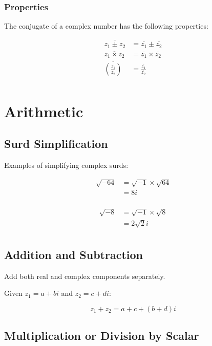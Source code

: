 \documentclass[a4paper,11pt]{article}
\begin{document}
\subsubsection{Properties}

The conjugate of a complex number has the following properties:

$$
\begin{aligned}
\overline{z_1 \pm z_2} & = \overline{z_1} \pm \overline{z_2} \\
\overline{z_1 \times z_2} & = \overline{z_1} \times \overline{z_2} \\
\overline{(\frac{z_1}{z_2})} & = \frac{\overline{z_1}}{\overline{z_2}} \\
\end{aligned}
$$




\section{Arithmetic}

\subsection{Surd Simplification}

Examples of simplifying complex surds:

$$
\begin{aligned}
\sqrt{-64} & = \sqrt{-1} \times \sqrt{64} \\
& = 8i \\
\end{aligned}
$$

$$
\begin{aligned}
\sqrt{-8} & = \sqrt{-1} \times \sqrt{8} \\
& = 2 \sqrt{2} i \\
\end{aligned}
$$


\subsection{Addition and Subtraction}

Add both real and complex components separately.

Given $z_1 = a + bi$ and $z_2 = c + di$:

$$
z_1 + z_2 = a + c + (b + d)i
$$


\subsection{Multiplication or Division by Scalar}
\end{document}
